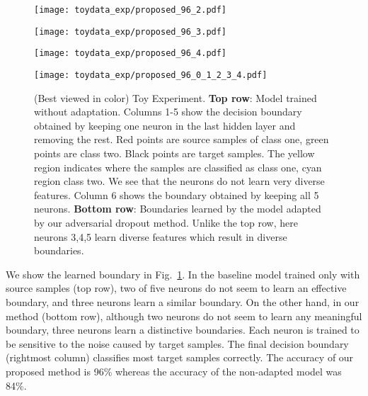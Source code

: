 \documentclass{article} \usepackage{iclr2018_conference,times}
\begin{document}
\begin{figure}[t]
\begin{minipage}{0.16\hsize}
\begin{center}
  \texttt{[image: toydata\_exp/proposed\_96\_2.pdf]}
 \end{center}
 \end{minipage}
  \begin{minipage}{0.16\hsize}
 \begin{center}
  \texttt{[image: toydata\_exp/proposed\_96\_3.pdf]}
 \end{center}
 \end{minipage}
  \begin{minipage}{0.16\hsize}
 \begin{center}
  \texttt{[image: toydata\_exp/proposed\_96\_4.pdf]}
 \end{center}
  \end{minipage}
    \begin{minipage}{0.16\hsize}
 \begin{center}
  \texttt{[image: toydata\_exp/proposed\_96\_0\_1\_2\_3\_4.pdf]}
 \end{center}
 \end{minipage}

    \caption{{\small (Best viewed in color) Toy Experiment. {\bf Top row}: Model trained without adaptation. Columns 1-5 show the decision boundary obtained by keeping one neuron in the last hidden layer and removing the rest. Red points are source samples of class one, green points are class two. Black points are target samples. The yellow region indicates where the samples are classified as class one, cyan region class two. We see that the neurons do not learn very diverse features. Column 6 shows the boundary obtained by keeping all 5 neurons. 
    {\bf Bottom row}: Boundaries learned by the model adapted by our adversarial dropout method. Unlike the top row, here neurons 3,4,5 learn diverse features which result in diverse boundaries. } }
\label{fig:toy_data}
\vspace{-3mm}
\end{figure}

 We show the learned boundary in Fig.~\ref{fig:toy_data}. In the baseline model trained only with source samples (top row), two of five neurons do not seem to learn an effective boundary, and three neurons learn a similar boundary. On the other hand, in our method (bottom row), although two neurons do not seem to learn any meaningful boundary, three neurons learn a distinctive boundaries. Each neuron is trained to be sensitive to the noise caused by target samples. The final decision boundary (rightmost column) classifies most target samples correctly. The accuracy of our proposed method is 96\% whereas the accuracy of the non-adapted model was 84\%. 
\end{document}
